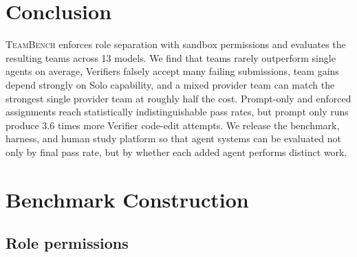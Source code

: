 \documentclass{article}
\begin{document}
\section{Conclusion}
\label{sec:conclusion}

\textsc{TeamBench} enforces role separation with sandbox permissions and evaluates the resulting teams across 13 models. We find that teams rarely outperform single agents on average, Verifiers falsely accept many failing submissions, team gains depend strongly on Solo capability, and a mixed provider team can match the strongest single provider team at roughly half the cost. Prompt-only and enforced assignments reach statistically indistinguishable pass rates, but prompt only runs produce 3.6 times more Verifier code-edit attempts. We release the benchmark, harness, and human study platform so that agent systems can be evaluated not only by final pass rate, but by whether each added agent performs distinct work.




\newpage

\appendix

\section{Benchmark Construction}
\label{app:construction}

\subsection{Role permissions}
\label{app:role-permissions}
\end{document}
